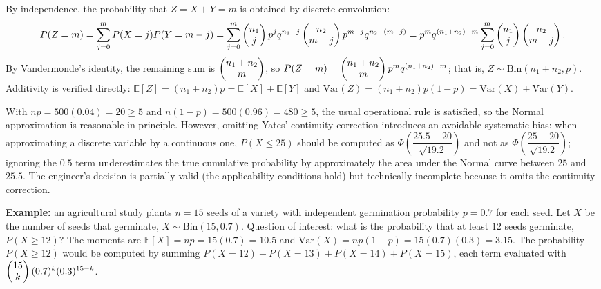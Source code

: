 \begin{solproblema}
	By independence, the probability that $Z=X+Y=m$ is obtained by discrete convolution:
	\begin{align*}
		P(Z=m) = \sum_{j=0}^m P(X=j)P(Y=m-j) = \sum_{j=0}^m \begin{pmatrix} n_1 \\ j\end{pmatrix}p^j q^{n_1-j} \begin{pmatrix} n_2 \\ m-j\end{pmatrix}p^{m-j}q^{n_2-(m-j)} = p^m q^{(n_1+n_2)-m}\sum_{j=0}^m \begin{pmatrix} n_1 \\ j\end{pmatrix}\begin{pmatrix} n_2 \\ m-j\end{pmatrix}.
	\end{align*}
	By Vandermonde's identity, the remaining sum is $\begin{pmatrix} n_1+n_2 \\ m\end{pmatrix}$, so $P(Z=m) = \begin{pmatrix} n_1+n_2 \\ m\end{pmatrix}p^m q^{(n_1+n_2)-m}$; that is, $Z \sim \text{Bin}(n_1+n_2,p)$. Additivity is verified directly: $\mathbb{E}[Z]=(n_1+n_2)p=\mathbb{E}[X]+\mathbb{E}[Y]$ and $\text{Var}(Z)=(n_1+n_2)p(1-p)=\text{Var}(X)+\text{Var}(Y)$.
\end{solproblema}

\begin{solproblema}[prob:19f50da]
	With $np = 500(0.04) = 20 \ge 5$ and $n(1-p) = 500(0.96) = 480 \ge 5$, the usual operational rule is satisfied, so the Normal approximation is reasonable in principle. However, omitting Yates' continuity correction introduces an avoidable systematic bias: when approximating a discrete variable by a continuous one, $P(X \le 25)$ should be computed as $\Phi\!\left(\dfrac{25.5-20}{\sqrt{19.2}}\right)$ and not as $\Phi\!\left(\dfrac{25-20}{\sqrt{19.2}}\right)$; ignoring the $0.5$ term underestimates the true cumulative probability by approximately the area under the Normal curve between $25$ and $25.5$. The engineer's decision is partially valid (the applicability conditions hold) but technically incomplete because it omits the continuity correction.
\end{solproblema}

\begin{solproblema}[prob:3c14103]
	\textbf{Example:} an agricultural study plants $n=15$ seeds of a variety with independent germination probability $p=0.7$ for each seed. Let $X$ be the number of seeds that germinate, $X \sim \text{Bin}(15, 0.7)$. Question of interest: what is the probability that at least $12$ seeds germinate, $P(X \ge 12)$? The moments are $\mathbb{E}[X] = np = 15(0.7) = 10.5$ and $\text{Var}(X) = np(1-p) = 15(0.7)(0.3) = 3.15$. The probability $P(X\ge12)$ would be computed by summing $P(X=12)+P(X=13)+P(X=14)+P(X=15)$, each term evaluated with $\begin{pmatrix} 15 \\ k\end{pmatrix}(0.7)^k(0.3)^{15-k}$.
\end{solproblema}
